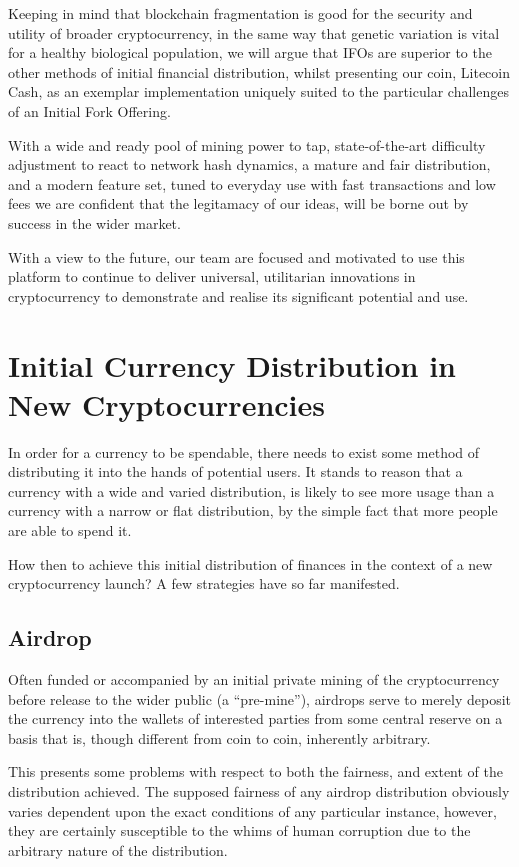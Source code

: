 \documentclass{IOS-Book-Article}
\begin{document}
Keeping in mind that blockchain fragmentation is good for the security and utility of 
broader cryptocurrency, in the same way that genetic variation is vital for a healthy 
biological population, we will argue that IFOs are superior to the other methods of 
initial financial distribution, whilst presenting our coin, Litecoin Cash, as an exemplar 
implementation uniquely suited to the particular challenges of an Initial Fork Offering. 

With a wide and ready pool of mining power to tap,
state-of-the-art difficulty adjustment to react to network hash dynamics, a mature and fair distribution,
and a modern feature set, tuned to everyday use with fast transactions and low fees we are confident
that the legitamacy of our ideas, will be borne out by success in the wider market.

With a view to the future, our team are focused and motivated to use this platform to
continue to deliver universal, utilitarian innovations in cryptocurrency to demonstrate 
and realise its significant potential and use.

\section{Initial Currency Distribution in New Cryptocurrencies}

In order for a currency to be spendable, there needs to exist some method
of distributing it into the hands of potential users. It stands to reason that 
a currency with a wide and varied distribution, is likely to see more usage
than a currency with a narrow or flat distribution, by the simple fact that
more people are able to spend it.

How then to achieve this initial distribution of finances in the context of a 
new cryptocurrency launch? A few strategies have so far manifested.

\subsection{Airdrop}
Often funded or accompanied by an initial private mining of the cryptocurrency 
before release to the wider public (a ``pre-mine''), airdrops serve to merely
deposit the currency into the wallets of interested parties from some central 
reserve on a basis that is, though different from coin to coin, inherently arbitrary.

This presents some problems with respect to both the fairness, and extent of the 
distribution achieved. The supposed fairness of any airdrop distribution obviously 
varies dependent upon the exact conditions of any particular instance, however, they
are certainly susceptible to the whims of human corruption due to the arbitrary nature
of the distribution.
\end{document}
